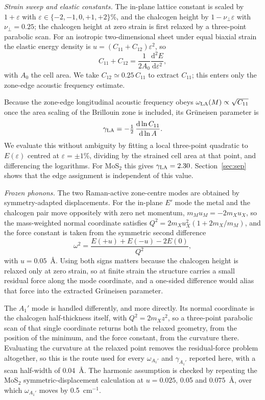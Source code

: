 \documentclass[aip,apl,amsmath,amssymb,reprint,longbibliography]{revtex4-1}
\begin{document}
\emph{Strain sweep and elastic constants.} The in-plane lattice constant is
scaled by $1+\varepsilon$ with $\varepsilon\in\{-2,-1,0,+1,+2\}\%$, and the
chalcogen height by $1-\nu_\perp\varepsilon$ with $\nu_\perp=0.25$; the
chalcogen height at zero strain is first relaxed by a three-point parabolic
scan. For an isotropic two-dimensional sheet under equal biaxial strain the
elastic energy density is $u=(C_{11}+C_{12})\varepsilon^2$, so
\begin{equation}
C_{11}+C_{12}=\frac{1}{2A_0}\frac{\mathrm{d}^2E}{\mathrm{d}\varepsilon^2},
\end{equation}
with $A_0$ the cell area. We take $C_{12}\simeq0.25\,C_{11}$ to extract
$C_{11}$; this enters only the zone-edge acoustic frequency estimate.

Because the zone-edge longitudinal acoustic frequency obeys
$\omega_{\rm LA}(M)\propto\sqrt{C_{11}}$ once the area scaling of the
Brillouin zone is included, its Gr\"uneisen parameter is
\begin{equation}
\gamma_{\rm LA}=-\tfrac12\,\frac{\mathrm{d}\ln C_{11}}{\mathrm{d}\ln A}.
\label{eq:glaS}
\end{equation}
We evaluate this without ambiguity by fitting a local three-point quadratic to
$E(\varepsilon)$ centred at $\varepsilon=\pm1\%$, dividing by the strained
cell area at that point, and differencing the logarithms. For MoS$_2$ this
gives $\gamma_{\rm LA}=2.30$. Section~\ref{sec:sep} shows that the edge
assignment is independent of this value.

\emph{Frozen phonons.} The two Raman-active zone-centre modes are obtained by
symmetry-adapted displacements. For the in-plane $E'$ mode the metal and the
chalcogen pair move oppositely with zero net momentum, $m_Mu_M=-2m_Xu_X$, so
the mass-weighted normal coordinate satisfies $Q^2=2m_Xu_X^2(1+2m_X/m_M)$,
and the force constant is taken from the symmetric second difference
\begin{equation}
\omega^2=\frac{E(+u)+E(-u)-2E(0)}{Q^2},
\label{eq:sym}
\end{equation}
with $u=0.05$~\AA. Using both signs matters because the chalcogen height is
relaxed only at zero strain, so at finite strain the structure carries a small
residual force along the mode coordinate, and a one-sided difference would
alias that force into the extracted Gr\"uneisen parameter.

The $A_1'$ mode is handled differently, and more directly. Its normal
coordinate is the chalcogen half-thickness itself, with $Q^2=2m_Xz^2$, so a
three-point parabolic scan of that single coordinate returns both the relaxed
geometry, from the position of the minimum, and the force constant, from the
curvature there. Evaluating the curvature at the relaxed point removes the
residual-force problem altogether, so this is the route used for every
$\omega_{A_1'}$ and $\gamma_{A_1'}$ reported here, with a scan half-width of
0.04~\AA. The harmonic assumption is checked by repeating the MoS$_2$
symmetric-displacement calculation at $u=0.025$, 0.05 and $0.075$~\AA, over
which $\omega_{A_1'}$ moves by 0.5~cm$^{-1}$.
\end{document}

